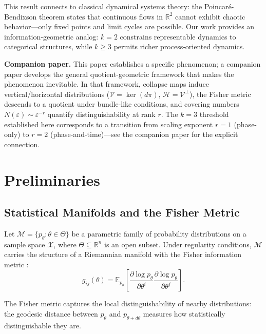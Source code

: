 \documentclass[12pt]{article}
\newcommand{\R}{\mathbb{R}}
\newcommand{\M}{\mathcal{M}}
\begin{document}
This result connects to classical dynamical systems theory: the Poincar\'e-Bendixson theorem \citep{poincare1881memoire,bendixson1901courbes,guckenheimer1983nonlinear} states that continuous flows in $\R^2$ cannot exhibit chaotic behavior---only fixed points and limit cycles are possible. Our work provides an information-geometric analog: $k=2$ constrains representable dynamics to categorical structures, while $k \geq 3$ permits richer process-oriented dynamics.

\textbf{Companion paper.} This paper establishes a specific phenomenon; a companion paper \citep{todd2025quotient} develops the general quotient-geometric framework that makes the phenomenon inevitable. In that framework, collapse maps induce vertical/horizontal distributions ($\mathcal{V} = \ker(d\pi)$, $\mathcal{H} = \mathcal{V}^\perp$), the Fisher metric descends to a quotient under bundle-like conditions, and covering numbers $N(\varepsilon) \sim \varepsilon^{-r}$ quantify distinguishability at rank $r$. The $k = 3$ threshold established here corresponds to a transition from scaling exponent $r = 1$ (phase-only) to $r = 2$ (phase-and-time)---see the companion paper for the explicit connection.

\section{Preliminaries}

\subsection{Statistical Manifolds and the Fisher Metric}

Let $\M = \{p_\theta : \theta \in \Theta\}$ be a parametric family of probability distributions on a sample space $\mathcal{X}$, where $\Theta \subseteq \R^n$ is an open subset. Under regularity conditions, $\M$ carries the structure of a Riemannian manifold with the Fisher information metric \citep{amari2000methods,fisher1925theory}:
\begin{equation}
    g_{ij}(\theta) = \mathbb{E}_{p_\theta}\left[\frac{\partial \log p_\theta}{\partial \theta^i} \frac{\partial \log p_\theta}{\partial \theta^j}\right].
\end{equation}

The Fisher metric captures the local distinguishability of nearby distributions: the geodesic distance between $p_\theta$ and $p_{\theta + d\theta}$ measures how statistically distinguishable they are.
\end{document}
